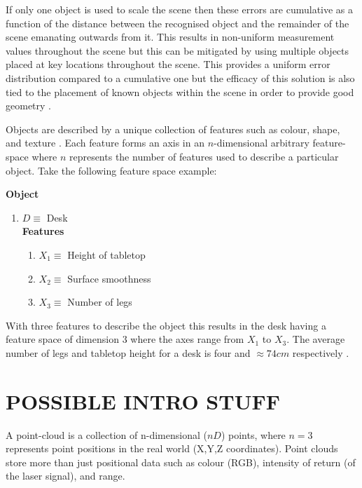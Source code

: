 If only one object is used to scale the scene then these errors are cumulative as a function of the distance between the recognised object and the remainder of the scene emanating outwards from it. This results in non-uniform measurement values throughout the scene but this can be mitigated by using multiple objects placed at key locations throughout the scene. This provides a uniform error distribution compared to a cumulative one but the efficacy of this solution is also tied to the placement of known objects within the scene in order to provide good geometry \citep{rashidi_generating_2014}.





Objects are described by a unique collection of features such as colour, shape, and texture \citep{davidson-pilon_machine_2012}. Each feature forms an axis in an $n$-dimensional arbitrary feature-space where $n$ represents the number of features used to describe a particular object. Take the following feature space example:

\textbf{Object}
\begin{enumerate}
	\item $D \equiv $ Desk \\
	\textbf{Features}
	\begin{enumerate}
		\item $X_1 \equiv$ Height of tabletop
		\item $X_2 \equiv$ Surface smoothness
		\item $X_3 \equiv$ Number of legs
	\end{enumerate}
\end{enumerate}

With three features to describe the object this results in the desk having a feature space of dimension $3$ where the axes range from $X_1$ to $X_3$. The average number of legs and tabletop height for a desk is four and $\approx74cm$ respectively \citep{budnick_29_2014}.

\section{POSSIBLE INTRO STUFF}
A point-cloud is a collection of n-dimensional ($nD$) points, where $n=3$  represents point positions in the real world (X,Y,Z coordinates). Point clouds store more than just positional data such as colour (RGB), intensity of return (of the laser signal), and range. 

